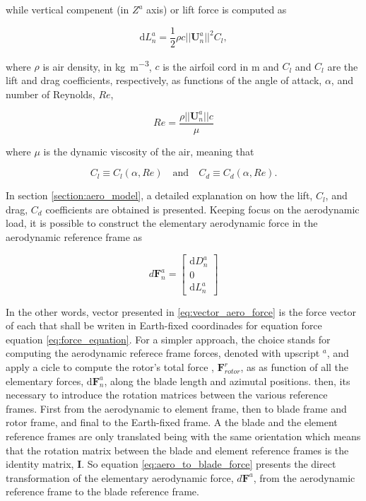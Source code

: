 while vertical compenent (in $Z^a$ axis) or lift force is computed as

\begin{equation}
    \mathrm{d}L^a_n = \frac{1}{2} \rho c ||\mathbf{U}^a_n||^2 C_l,
    \label{eq:lift_element}
\end{equation}

where $\rho$ is air density, in \unit{\kg\per\meter^3}, $c$ is the airfoil cord in \unit{\meter} and $C_l$ and $C_l$ are the lift and drag coefficients, respectively, as functions of the angle of attack, $\alpha$, and number of Reynolds, $Re$,

\begin{equation}
    Re = \frac{\rho ||\mathbf{U}^a_n|| c}{\mu}
    \label{eq:reynolds_number}
\end{equation}

where $\mu$ is the dynamic viscosity of the air, meaning that

\begin{equation}
    C_l \equiv C_l(\alpha, Re) \quad \text{and} \quad C_d\equiv C_d(\alpha, Re).
\end{equation}

In section \ref{section:aero_model}, a detailed explanation on how the lift, $C_l$, and drag, $C_d$ coefficients are obtained is presented. Keeping focus on the aerodynamic load, it is possible to construct the elementary aerodynamic force in the aerodynamic reference frame as

\begin{equation}
    d\mathbf{F}^a_n = \begin{bmatrix}
        \mathrm{d}D^a_n \\ 0 \\ \mathrm{d}L^a_n
    \end{bmatrix}
    \label{eq:vector_aero_force}
\end{equation}

In the other words, vector presented in \ref{eq:vector_aero_force} is the force vector of each that shall be writen in Earth-fixed coordinades for equation force equation \ref{eq:force_equation}. For a simpler approach, the choice stands for computing the aerodynamic referece frame forces, denoted with upscript $^a$, and apply a cicle to compute the rotor's total force , $\mathbf{F}^r_{rotor}$, as as function of all the elementary forces, $\mathrm{d}\mathbf{F}^a_n$, along the blade length and azimutal positions. then, its necessary to introduce the rotation matrices between the various reference frames. First from the aerodynamic to element frame, then to blade frame and rotor frame, and final to the Earth-fixed frame. A the blade and the element reference frames are only translated being with the same orientation which means that the rotation matrix between the blade and element reference frames is the identity matrix, $\mathbf{I}$. So equation \ref{eq:aero_to_blade_force} presents the direct transformation of the elementary aerodynamic force, $d\mathbf{F}^a$, from the aerodynamic reference frame to the blade reference frame.

